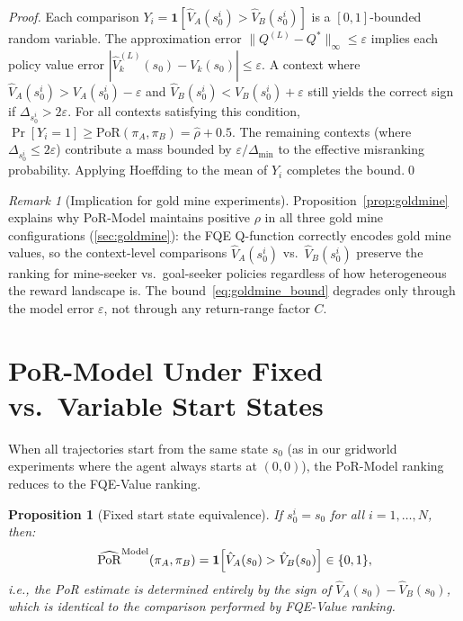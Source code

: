 \documentclass[10pt]{article}
\theoremstyle{plain}
\newtheorem{proposition}[theorem]{Proposition}
\theoremstyle{definition}
\theoremstyle{remark}
\newtheorem{remark}{Remark}
\newcommand{\PoR}{\mathrm{PoR}}
\newcommand{\piA}{\pi_A}
\newcommand{\piB}{\pi_B}
\begin{document}
\begin{proof}
  Each comparison $Y_i=\mathbf{1}[\hat{V}_A(s_0^i)>\hat{V}_B(s_0^i)]$
  is a $[0,1]$-bounded random variable.  The approximation error
  $\|Q^{(L)}-Q^*\|_\infty\leq\varepsilon$ implies each policy value error
  $|\hat{V}_k^{(L)}(s_0)-V_k(s_0)|\leq\varepsilon$.  A context where
  $\hat{V}_A(s_0^i)>V_A(s_0^i)-\varepsilon$ and
  $\hat{V}_B(s_0^i)<V_B(s_0^i)+\varepsilon$ still yields the correct sign if
  $\Delta_{s_0^i}>2\varepsilon$.  For all contexts satisfying this condition,
  $\Pr[Y_i=1]\geq \PoR(\piA,\piB)=\hat{\rho}+0.5$.  The remaining contexts
  (where $\Delta_{s_0^i}\leq 2\varepsilon$) contribute a mass bounded by
  $\varepsilon/\Delta_{\min}$ to the effective misranking probability.
  Applying Hoeffding to the mean of $Y_i$ completes the bound.\qed
\end{proof}

\begin{remark}[Implication for gold mine experiments]
  Proposition~\ref{prop:goldmine} explains why PoR-Model maintains positive
  $\rho$ in all three gold mine configurations (\cref{sec:goldmine}):
  the FQE Q-function correctly encodes gold mine values, so the context-level
  comparisons $\hat{V}_A(s_0^i)$ vs.\ $\hat{V}_B(s_0^i)$ preserve the
  ranking for mine-seeker vs.\ goal-seeker policies regardless of how
  heterogeneous the reward landscape is.  The bound~\eqref{eq:goldmine_bound}
  degrades only through the model error $\varepsilon$, not through any
  return-range factor $C$.
\end{remark}

\section{PoR-Model Under Fixed vs.\ Variable Start States}
\label{app:fixed_start}

When all trajectories start from the same state $s_0$ (as in our gridworld
experiments where the agent always starts at $(0,0)$), the PoR-Model ranking
reduces to the FQE-Value ranking.

\begin{proposition}[Fixed start state equivalence]
  \label{prop:fixed_start}
  If $s_0^i = s_0$ for all $i=1,\ldots,N$, then:
  \begin{equation}
    \widehat{\PoR}^{\rm Model}(\piA,\piB)
    = \mathbf{1}\!\left[\hat{V}_A(s_0) > \hat{V}_B(s_0)\right] \in \{0,1\},
    \label{eq:por_fixed}
  \end{equation}
  i.e., the PoR estimate is determined entirely by the sign of
  $\hat{V}_A(s_0)-\hat{V}_B(s_0)$, which is identical to the comparison
  performed by FQE-Value ranking.
\end{proposition}
\end{document}
